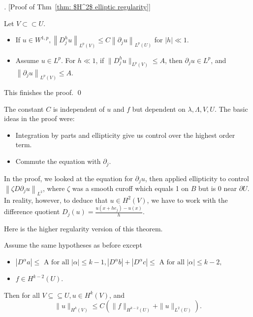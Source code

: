 \begin{proof}[][Proof of Thm~\ref{thm: $H^2$ elliptic regularity}]
\begin{lemma}
\label{lem: Diffrence quotient to derivative}
Let $V\subset \subset U$. 
\begin{itemize}
    \item If $u \in W^{1, p},\left\|D_{j}^{h} u\right\|_{L^{p}(V)} \leq C\left\|\partial_{j} u\right\|_{L^{p}(U)}$ for $|h| \ll 1$. 
    \item     Assume $u \in L^{p}$. For $h \ll 1$, if $\| D_{j}^{h} u \|_{ L^{p}(V)} \leq A$, then $\partial_{j}u \in L^{p}$, and $\left\|\partial_{j} u\right\|_{L^{p}(V)} \leq A$.
\end{itemize}
\end{lemma}


This finishes the proof. 
\qed 
\end{proof}


\begin{remark}
 The constant $C$ is independent of $u$ and $f$ but dependent on $\lambda, \Lambda, V, U$.
The basic ideas in the proof were:
\begin{itemize}
    \item Integration by parts and ellipticity give us control over the highest order term.
    \item Commute the equation with $\partial_{j}$.
\end{itemize} 


In the proof, we looked at the equation for $\partial_{j} u$, then applied ellipticity to control $\left\|\zeta D \partial_{j} u\right\|_{L^{2}}$, where $\zeta$ was a smooth curoff which equals 1 on $B$ but is 0 near $\partial U$. In reality, however, to deduce that $u \in H^{2}(V)$, we have to work with the difference quotient $D_{j}(u)=\frac{u\left(x+h e_{j}\right)-u(x)}{h} .$
\end{remark}

Here is the higher regularity version of this theorem.


\begin{theorem}
\label{thm: $H^k$ elliptic interior regularity}
Assume the same hypotheses as before except 
\begin{itemize}
    \item $\left|D^{\alpha} a\right| \leq \text { A for all }|\alpha| \leq k-1,\left|D^{\alpha} b\right|+\left|D^{\alpha} c\right| \leq \text { A for all }|\alpha| \leq k-2 \text {, }$ 
    \item $f\in H^{k-2}(U)$. 
\end{itemize}
Then for all $V \subseteq \subseteq U, u \in H^{k}(V)$, and
$$
\|u\|_{H^{k}(V)} \leq C\left(\|f\|_{H^{k-2}(U)}+\|u\|_{L^{2}(U)}\right) .
$$
\end{theorem}

